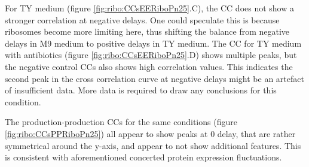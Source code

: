 For TY medium (figure \ref{fig:ribo:CCsEERiboPn25}.C), the CC does not show a stronger correlation at negative delays.
%
One could speculate this is because ribosomes become more limiting here, thus shifting the balance from negative delays in M9 medium to positive delays in TY medium.
%
The CC for TY medium with antibiotics (figure \ref{fig:ribo:CCsEERiboPn25}.D) shows multiple peaks, 
but 
the negative control CCs also shows high correlation values.
%
This indicates the second peak in the cross correlation curve at negative delays might be an artefact of insufficient data.
More data is required to draw any conclusions for this condition. 


The production-production CCs for the same conditions (figure \ref{fig:ribo:CCsPPRiboPn25}) all appear to show peaks at 0 delay, that are rather symmetrical around the y-axis, and appear to not show additional features.
This is consistent with aforementioned concerted protein expression fluctuations.



